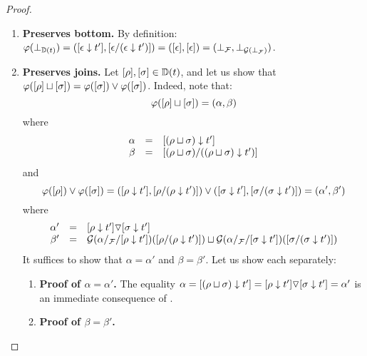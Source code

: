 \begin{proof}
\begin{enumerate}
\begin{enumerate}
\begin{enumerate}
    \end{enumerate}
  \item {\bf Preserves bottom.}
    By definition:
    $\varphi(\bot_{\mathbb{D}(t)})
     = ({[\epsilon \downarrow t']}, {[\epsilon/(\epsilon \downarrow t')]})
     = ({[\epsilon]},{[\epsilon]})
     = (\bot_{\mathcal{F}},\bot_{\mathcal{G}(\bot_{\mathcal{F}})})$.
  \item {\bf Preserves joins.}
    Let ${[\rho]},{[\sigma]} \in \mathbb{D}(t)$, and let us show that
    $\varphi({[\rho]} \sqcup {[\sigma]}) = \varphi({[\sigma]}) \lor \varphi({[\sigma]})$.
    Indeed, note that:
    \[
      \varphi({[\rho]} \sqcup {[\sigma]}) = (\alpha,\beta)
    \]
    where
    \[
      \begin{array}{rcl}
      \alpha & = & {[(\rho \sqcup \sigma) \downarrow t']} \\
      \beta  & = & {[(\rho \sqcup \sigma) / ((\rho \sqcup \sigma) \downarrow t')]} \\
      \end{array}
    \]
    and
    \[
      \varphi({[\rho]}) \lor \varphi({[\sigma]})
      = ({[\rho \downarrow t']}, {[\rho / (\rho \downarrow t')]}) \lor
        ({[\sigma \downarrow t']}, {[\sigma / (\sigma \downarrow t')]}) \\
      = (\alpha', \beta') \\
    \]
    where
    \[
      \begin{array}{rcl}
      \alpha' & = & {[\rho \downarrow t']} \triangledown {[\sigma\downarrow t']} \\
      \beta'  & = &
             \mathcal{G}(\alpha/_{\mathcal{F}}/{[\rho \downarrow t']})({[\rho / (\rho \downarrow t')]}) \sqcup \mathcal{G}(\alpha/_{\mathcal{F}}/{[\sigma \downarrow t']})({[\sigma / (\sigma \downarrow t')]})
      \end{array}
    \]
    It suffices to show that $\alpha = \alpha'$ and $\beta = \beta'$.
    Let us show each separately:
    \begin{enumerate}
    \item {\bf Proof of $\alpha = \alpha'$.}
      The equality
      $
        \alpha
        = {[(\rho \sqcup \sigma) \downarrow t']}
        = {[\rho \downarrow t']} \triangledown {[\sigma\downarrow t']}
        = \alpha'
      $
      is an immediate consequence of .
    \item {\bf Proof of $\beta = \beta'$.}

\end{enumerate}
\end{enumerate}
\end{enumerate}
\end{proof}
